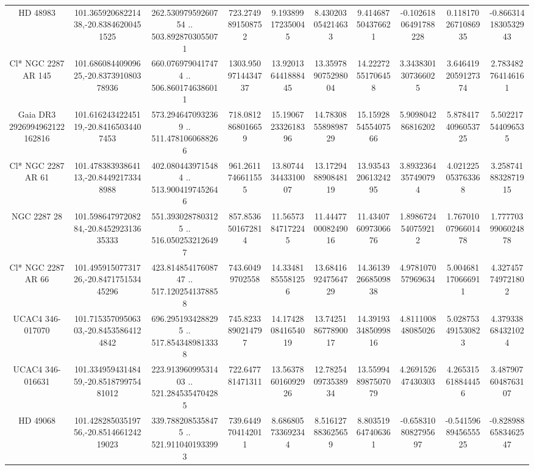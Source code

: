 \begin{table}
\begin{tabular}{cccccccccc}
HD  48983 & 101.36592068221438,-20.83846200451525 & 262.53097959260754 .. 503.8928703055071 & 723.2749891508752 & 9.193899172350045 & 8.430203054214633 & 9.414687504376621 & -0.10261806491788228 & 0.1181702671086935 & -0.8663141830532943 \\
Cl* NGC 2287     AR     145 & 101.68608440909625,-20.837391080378936 & 660.0769790417474 .. 506.8601746386011 & 1303.9509714434737 & 13.920136441888445 & 13.359789075298004 & 14.22272551706458 & 3.3438301307366025 & 3.6464192059127374 & 2.783482764146161 \\
Gaia DR3 2926994962122162816 & 101.61624342245119,-20.84165034407453 & 573.2946470932369 .. 511.4781060688266 & 718.0812868016659 & 15.190672332618396 & 14.783085589898729 & 15.159285455407566 & 5.909804286816202 & 5.8784174096053725 & 5.502217544096535 \\
Cl* NGC 2287     AR      61 & 101.47838393864113,-20.84492173348988 & 402.0804439715484 .. 513.9004197452646 & 961.2611746611555 & 13.807443443310007 & 13.172948890848119 & 13.935432061324295 & 3.8932364357490794 & 4.021225053763368 & 3.2587418832871915 \\
NGC  2287    28 & 101.59864797208284,-20.845292313635333 & 551.3930287803125 .. 516.0502532126497 & 857.8536501672814 & 11.56573847172245 & 11.444770008249016 & 11.434076097306676 & 1.8986724540759212 & 1.7670100796601478 & 1.7777039906024878 \\
Cl* NGC 2287     AR      66 & 101.49591507731726,-20.847175153445296 & 423.81485417608747 .. 517.1202541378858 & 743.60499702558 & 14.33481855581256 & 13.684169247564729 & 14.361392668509838 & 4.978107057969634 & 5.004681170666911 & 4.327457749721802 \\
UCAC4 346-017070 & 101.71535709506303,-20.84535864124842 & 696.2951934288295 .. 517.8543489813338 & 745.8233890214797 & 14.174280841654019 & 13.742518677890017 & 14.391933485099816 & 4.811100848085026 & 5.028753491530823 & 4.379338684321024 \\
UCAC4 346-016631 & 101.33495943148459,-20.851879975481012 & 223.91396099531403 .. 521.2845354704285 & 722.647781471311 & 13.563786016092926 & 12.782540973538934 & 13.559948987507079 & 4.269152647430303 & 4.265315618844456 & 3.4879076048763107 \\
HD  49068 & 101.42828503519756,-20.851466124219023 & 339.7882085358475 .. 521.9110401933993 & 739.6449704142011 & 8.686805733692344 & 8.516127883625659 & 8.803519647406361 & -0.6583108082795697 & -0.5415968945655525 & -0.8289886583462547 \\

\end{tabular}
\end{table}
